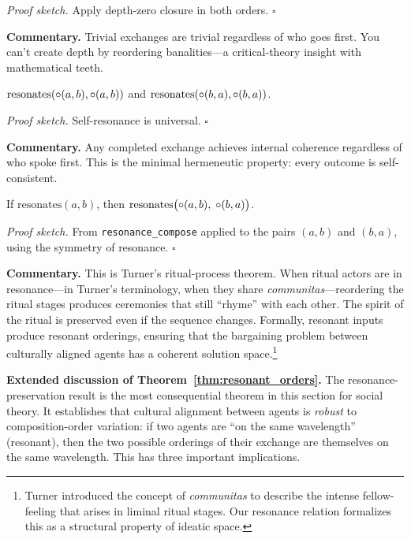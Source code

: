 \noindent\textit{Proof sketch.}\quad
Apply depth-zero closure in both orders.
\hfill$\square$

\medskip

\noindent\textbf{Commentary.}
Trivial exchanges are trivial regardless of who goes first.  You can't
create depth by reordering banalities---a critical-theory insight with
mathematical teeth.

\begin{theorem}
\label{thm:both_orders_self_resonate}
$\text{resonates}(\circ(a,b), \circ(a,b))$ and
$\text{resonates}(\circ(b,a), \circ(b,a))$.
\end{theorem}

\noindent\textit{Proof sketch.}\quad
Self-resonance is universal.
\hfill$\square$

\medskip

\noindent\textbf{Commentary.}
Any completed exchange achieves internal coherence regardless of who spoke
first.  This is the minimal hermeneutic property: every outcome is
self-consistent.

\begin{theorem}
\label{thm:resonant_orders}
If $\text{resonates}(a, b)$, then
$\text{resonates}\bigl(\circ(a, b),\; \circ(b, a)\bigr)$.
\end{theorem}

\noindent\textit{Proof sketch.}\quad
From \texttt{resonance\_compose} applied to the pairs $(a,b)$ and
$(b,a)$, using the symmetry of resonance.
\hfill$\square$

\medskip

\noindent\textbf{Commentary.}
This is Turner's ritual-process theorem.  When ritual actors are in
resonance---in Turner's terminology, when they share \emph{communitas}---reordering
the ritual stages produces ceremonies that still ``rhyme'' with each other.
The spirit of the ritual is preserved even if the sequence changes.
Formally, resonant inputs produce resonant orderings, ensuring that the
bargaining problem between culturally aligned agents has a coherent
solution space.\footnote{Turner introduced the concept of \emph{communitas}
to describe the intense fellow-feeling that arises in liminal ritual stages.
Our resonance relation formalizes this as a structural property of ideatic space.}

\medskip

\noindent\textbf{Extended discussion of Theorem~\ref{thm:resonant_orders}.}\quad
The resonance-preservation result is the most consequential theorem in this
section for social theory.  It establishes that cultural alignment between
agents is \emph{robust} to composition-order variation: if two agents are
``on the same wavelength'' (resonant), then the two possible orderings of
their exchange are themselves on the same wavelength.  This has three
important implications.

